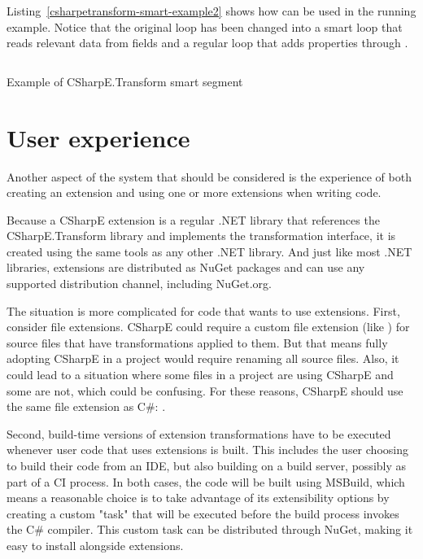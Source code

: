 Listing~\ref{csharpetransform-smart-example2} shows how  can be used in the running example. Notice that the original  loop has been changed into a smart loop that reads relevant data from fields and a regular  loop that adds properties through .

\begin{listing}
\inputminted[firstline=9,lastline=30]{csharp}{samples/CSharpETransform.Smart2/EntityTransformation.cs}
\caption{Example of CSharpE.Transform smart segment}
\label{csharpetransform-smart-example2}
\end{listing}

\section{User experience}

Another aspect of the system that should be considered is the experience of both creating an extension and using one or more extensions when writing code.

\medskip

Because a CSharpE extension is a regular .NET library that references the CSharpE.Transform library and implements the transformation interface, it is created using the same tools as any other .NET library. And just like most .NET libraries, extensions are distributed as NuGet packages and can use any supported distribution channel, including NuGet.org.

\medskip

The situation is more complicated for code that wants to use extensions. First, consider file extensions. CSharpE could require a custom file extension (like ) for source files that have transformations applied to them. But that means fully adopting CSharpE in a project would require renaming all source files. Also, it could lead to a situation where some files in a project are using CSharpE and some are not, which could be confusing. For these reasons, CSharpE should use the same file extension as C\#: .

Second, build-time versions of extension transformations have to be executed whenever user code that uses extensions is built. This includes the user choosing to build their code from an \ac{IDE}, but also building on a build server, possibly as part of a \ac{CI} process. In both cases, the code will be built using MSBuild, which means a reasonable choice is to take advantage of its extensibility options by creating a custom "task" that will be executed before the build process invokes the C\# compiler. This custom task can be distributed through NuGet, making it easy to install alongside extensions.

